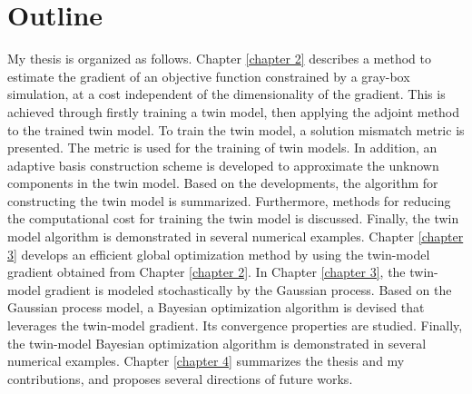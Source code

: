 \section{Outline}
My thesis is organized as follows. Chapter \ref{chapter 2}  describes a method to estimate the gradient of an
objective function constrained by a gray-box simulation, at a cost independent of the dimensionality
of the gradient. 
This is achieved through firstly training a twin model, then applying the adjoint method to the trained twin model.
To train the twin model, a solution mismatch metric is presented. The metric
is used for the training of twin models.  In addition, an adaptive basis construction scheme 
is developed to approximate the unknown components in the twin model. 
Based on the developments, the algorithm for constructing the twin model is summarized.
Furthermore, methods for reducing the computational cost for training the twin model is
discussed. Finally, the twin model algorithm is demonstrated in several numerical examples.
Chapter \ref{chapter 3} develops an efficient global optimization method by using the twin-model gradient obtained
from Chapter \ref{chapter 2}.
In Chapter \ref{chapter 3}, the twin-model gradient is modeled stochastically by the Gaussian process.
Based on the Gaussian process model, 
a Bayesian optimization algorithm is devised that leverages the twin-model gradient.
Its convergence properties are studied. Finally, the twin-model Bayesian optimization algorithm
is demonstrated in several numerical examples. Chapter \ref{chapter 4} summarizes the thesis and
my contributions, and proposes several directions of future works.

